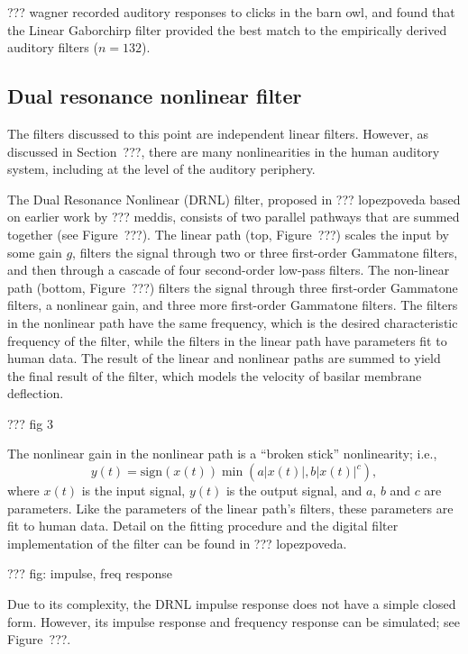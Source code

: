 ??? wagner recorded auditory responses
to clicks in the barn owl,
and found that the Linear Gaborchirp filter
provided the best match
to the empirically derived auditory filters
($n=132$).

\subsection{Dual resonance nonlinear filter}

The filters discussed to this point
are independent linear filters.
However, as discussed in Section~???,
there are many nonlinearities
in the human auditory system,
including at the level of the auditory periphery.

The Dual Resonance Nonlinear (DRNL) filter,
proposed in ??? lopezpoveda
based on earlier work by ??? meddis,
consists of two parallel pathways
that are summed together
(see Figure~???).
The linear path (top, Figure~???)
scales the input by some gain $g$,
filters the signal through
two or three first-order Gammatone filters,
and then through a cascade of
four second-order low-pass filters.
The non-linear path (bottom, Figure~???)
filters the signal through
three first-order Gammatone filters,
a nonlinear gain,
and three more first-order Gammatone filters.
The filters in the nonlinear path
have the same frequency,
which is the desired characteristic frequency
of the filter,
while the filters in the linear path
have parameters fit to human data.
The result of the linear and nonlinear paths
are summed to yield
the final result of the filter,
which models the velocity of
basilar membrane deflection.

??? fig 3

The nonlinear gain in the nonlinear path
is a ``broken stick'' nonlinearity;
i.e.,
\begin{equation}
  y(t) = \text{sign}(x(t)) \min(a |x(t)|, b |x(t)|^c),
\end{equation}
where $x(t)$ is the input signal,
$y(t)$ is the output signal,
and $a$, $b$ and $c$ are parameters.
Like the parameters of the linear path's filters,
these parameters are fit to human data.
Detail on the fitting procedure
and the digital filter implementation
of the filter can be found in ??? lopezpoveda.

??? fig: impulse, freq response

Due to its complexity,
the DRNL impulse response does not have a simple closed form.
However, its impulse response
and frequency response can be simulated;
see Figure~???.

